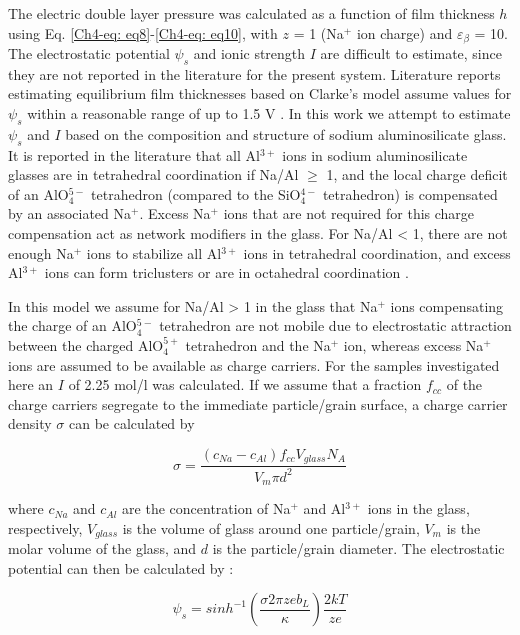 The electric double layer pressure was calculated as a function of film thickness $h$ using Eq. \ref{Ch4-eq: eq8}-\ref{Ch4-eq: eq10}, with $z$ = 1 (Na$^{+}$ ion charge) and $\varepsilon_{\beta}$ = 10. The electrostatic potential $\psi_{s}$ and ionic strength $I$ are difficult to estimate, since they are not reported in the literature for the present system. Literature reports estimating equilibrium film thicknesses based on Clarke's model assume values for $\psi_{s}$ within a reasonable range of up to 1.5 V \cite{Clarke1993,Tanaka1993}. In this work we attempt to estimate $\psi_{s}$ and $I$ based on the composition and structure of sodium aluminosilicate glass. It is reported in the literature \cite{Toplis1997} that all Al$^{3+}$ ions in sodium aluminosilicate glasses are in tetrahedral coordination if Na/Al $\geq$ 1, and the local charge deficit of an AlO$_{4}^{5-}$ tetrahedron (compared to the SiO$_{4}^{4-}$ tetrahedron) is compensated by an associated Na$^{+}$. Excess Na$^{+}$ ions that are not required for this charge compensation act as network modifiers in the glass. For Na/Al < 1, there are not enough Na$^{+}$ ions to stabilize all Al$^{3+}$ ions in tetrahedral coordination, and excess Al$^{3+}$ ions can form triclusters or are in octahedral coordination \cite{Toplis1997}. 

In this model we assume for Na/Al > 1 in the glass that Na$^{+}$ ions compensating the charge of an AlO$_{4}^{5-}$ tetrahedron are not mobile due to electrostatic attraction between the charged AlO$_{4}^{5+}$ tetrahedron and the Na$^{+}$ ion, whereas excess Na$^{+}$ ions are assumed to be available as charge carriers. For the samples investigated here an $I$ of 2.25 mol/l was calculated. If we assume that a fraction $f_{cc}$ of the charge carriers segregate to the immediate particle/grain surface, a charge carrier density $\sigma$ can be calculated by

\begin{equation}
\label{Ch4-eq: eq11}
\sigma = \frac{\left( c_{Na} - c_{Al} \right) f_{cc} V_{glass} N_{A}}{V_{m} \pi d^{2}}
\end{equation}

\noindent where $c_{Na}$ and $c_{Al}$ are the concentration of Na$^{+}$ and Al$^{3+}$ ions in the glass, respectively, $V_{glass}$ is the volume of glass around one particle/grain, $V_{m}$ is the molar volume of the glass, and $d$ is the particle/grain diameter. The electrostatic potential can then be calculated by \cite{Clarke1993}:

\begin{equation}
\label{Ch4-eq: eq12}
\psi_{s} = sinh^{-1} \left( \frac{\sigma 2 \pi z e b_{L}}{\kappa} \right) \frac{2kT}{ze}
\end{equation}

